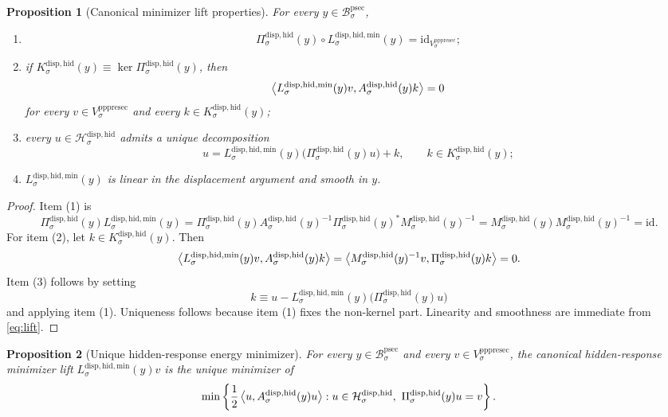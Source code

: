 \documentclass[11pt]{article}
\newcommand{\ProtoSectionBody}[1]{\mathcal B_{#1}^{\mathrm{psec}}}
\newcommand{\PrePreProtoSectionVertical}[1]{V_{#1}^{\mathrm{pppresec}}}
\newcommand{\HiddenCarrier}[1]{\mathcal H_{#1}^{\mathrm{disp,hid}}}
\newcommand{\HiddenReadout}[1]{\Pi_{#1}^{\mathrm{disp,hid}}}
\newcommand{\HiddenHessian}[1]{A_{#1}^{\mathrm{disp,hid}}}
\newcommand{\HiddenKernel}[1]{K_{#1}^{\mathrm{disp,hid}}}
\newcommand{\ReducedSchur}[1]{M_{#1}^{\mathrm{disp,hid}}}
\newcommand{\HiddenMinLift}[1]{L_{#1}^{\mathrm{disp,hid,min}}}
\newtheorem{proposition}{Proposition}
\begin{document}
\begin{proposition}[Canonical minimizer lift properties]
\label{prop:canonical}
For every \(y\in\ProtoSectionBody{\sigma}\),
\begin{enumerate}
    \item
    \[
    \HiddenReadout{\sigma}(y)\circ\HiddenMinLift{\sigma}(y)
    =
    \mathrm{id}_{\PrePreProtoSectionVertical{\sigma}};
    \]
    \item if \(\HiddenKernel{\sigma}(y)\equiv\ker\HiddenReadout{\sigma}(y)\), then
    \[
    \ev{
    \HiddenMinLift{\sigma}(y)v,
    \HiddenHessian{\sigma}(y)k
    }
    =
    0
    \]
    for every \(v\in\PrePreProtoSectionVertical{\sigma}\) and every \(k\in\HiddenKernel{\sigma}(y)\);
    \item every \(u\in\HiddenCarrier{\sigma}\) admits a unique decomposition
    \[
    u
    =
    \HiddenMinLift{\sigma}(y)\bigl(\HiddenReadout{\sigma}(y)u\bigr)
    +
    k,
    \qquad
    k\in\HiddenKernel{\sigma}(y);
    \]
    \item \(\HiddenMinLift{\sigma}(y)\) is linear in the displacement argument and smooth in \(y\).
\end{enumerate}
\end{proposition}

\begin{proof}
Item (1) is
\[
\HiddenReadout{\sigma}(y)\HiddenMinLift{\sigma}(y)
=
\HiddenReadout{\sigma}(y)
\HiddenHessian{\sigma}(y)^{-1}
\HiddenReadout{\sigma}(y)^*
\ReducedSchur{\sigma}(y)^{-1}
=
\ReducedSchur{\sigma}(y)\ReducedSchur{\sigma}(y)^{-1}
=
\mathrm{id}.
\]
For item (2), let \(k\in\HiddenKernel{\sigma}(y)\). Then
\[
\ev{
\HiddenMinLift{\sigma}(y)v,
\HiddenHessian{\sigma}(y)k
}
=
\ev{
\ReducedSchur{\sigma}(y)^{-1}v,
\HiddenReadout{\sigma}(y)k
}
=
0.
\]
Item (3) follows by setting
\[
k
\equiv
u-\HiddenMinLift{\sigma}(y)\bigl(\HiddenReadout{\sigma}(y)u\bigr)
\]
and applying item (1). Uniqueness follows because item (1) fixes the non-kernel part. Linearity and smoothness are immediate from \eqref{eq:lift}.
\end{proof}

\begin{proposition}[Unique hidden-response energy minimizer]
\label{prop:min}
For every \(y\in\ProtoSectionBody{\sigma}\) and every \(v\in\PrePreProtoSectionVertical{\sigma}\), the canonical hidden-response minimizer lift \(\HiddenMinLift{\sigma}(y)v\) is the unique minimizer of
\begin{equation}
\min\left\{
\frac{1}{2}\ev{u,\HiddenHessian{\sigma}(y)u}:
u\in\HiddenCarrier{\sigma},
\ \HiddenReadout{\sigma}(y)u=v
\right\}.
\label{eq:minproblem}
\end{equation}
\end{proposition}
\end{document}
